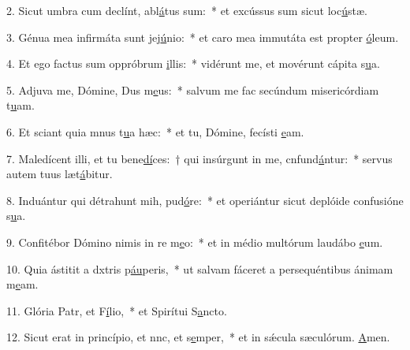 2. Sicut umbra cum declínt, abl\uline{á}tus sum:~* et excússus sum sicut loc\uline{ú}stæ.\par 
3. Génua mea infirmáta sunt  jej\uline{ú}nio:~* et caro mea immutáta est propter \uline{ó}leum.\par 
4. Et ego factus sum oppróbrum \uline{i}llis:~* vidérunt me, et movérunt cápita s\uline{u}a.\par 
5. Adjuva me, Dómine, Dus m\uline{e}us:~* salvum me fac secúndum misericórdiam t\uline{u}am.\par 
6. Et sciant quia mnus t\uline{u}a hæc:~* et tu, Dómine, fecísti \uline{e}am.\par 
7. Maledícent illi, et tu bene\uline{dí}ces:~† qui insúrgunt in me, cnfund\uline{á}ntur:~* servus autem tuus læt\uline{á}bitur.\par 
8. Induántur qui détrahunt mih, pud\uline{ó}re:~* et operiántur sicut deplóide confusióne s\uline{u}a.\par 
9. Confitébor Dómino nimis in re m\uline{e}o:~* et in médio multórum laudábo \uline{e}um.\par 
10. Quia ástitit a dxtris p\uline{áu}peris,~* ut salvam fáceret a persequéntibus ánimam m\uline{e}am.\par 
11. Glória Patr, et F\uline{í}lio,~* et Spirítui S\uline{a}ncto.\par 
12. Sicut erat in princípio, et nnc, et s\uline{e}mper,~* et in sǽcula sæculórum. \uline{A}men.\par 
